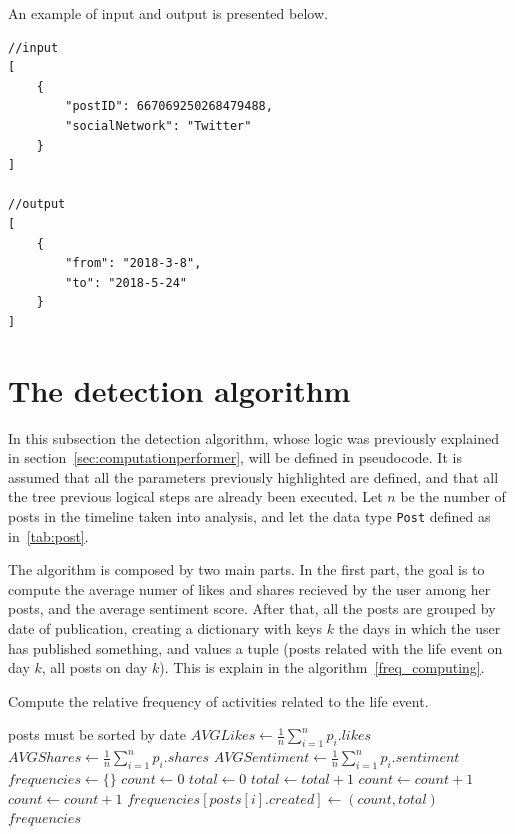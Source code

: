 An example of input and output is presented below.

\begin{Verbatim}
//input
[
	{
		"postID": 667069250268479488,
		"socialNetwork": "Twitter"
	}
]

//output
[
	{
		"from": "2018-3-8",
		"to": "2018-5-24"
	}
]
\end{Verbatim}

\section{The detection algorithm}
\label{sec:alg}

In this subsection the detection algorithm, whose logic was previously explained in section~\ref{sec:computationperformer}, will be defined in pseudocode. It is assumed that all the parameters previously highlighted are defined, and that all the tree previous logical steps are already been executed. Let $n$ be the number of posts in the timeline taken into analysis, and let the data type \texttt{Post} defined as in~\ref{tab:post}.

The algorithm is composed by two main parts. In the first part, the goal is to compute the average numer of likes and shares recieved by the user among her posts, and the average sentiment score. After that, all the posts are grouped by date of publication, creating a dictionary with keys $k$ the days in which the user has published something, and values a tuple (posts related with the life event on day $k$, all posts on day $k$). This is explain in the algorithm~\ref{freq_computing}.

\begin{algorithm}
\caption{Compute the relative frequency of activities related to the life event.}
\label{freq_computing}
\begin{algorithmic}[1]
\Require posts must be sorted by date
\State $AVGLikes \gets \frac{1}{n} \sum_{i=1}^n p_i.likes $
\State $AVGShares \gets \frac{1}{n} \sum_{i=1}^n p_i.shares $
\State $AVGSentiment \gets \frac{1}{n} \sum_{i=1}^n p_i.sentiment$
\State $frequencies \gets \{\}$
\State $count \gets 0$
\State $total \gets 0$
	\State $total \gets total + 1$
		\State $count \gets count + 1$
		\State $count \gets count + 1$
	\EndIf
		\State $frequencies[posts[i].created] \gets (count, total)$
	\EndIf
\EndFor
\Return $frequencies$
\EndFunction 
\end{algorithmic}
\end{algorithm}

